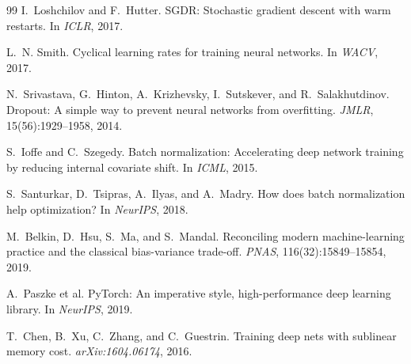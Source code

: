 \documentclass[11pt, a4paper]{article}
\begin{document}
\begin{thebibliography}{99}
I.~Loshchilov and F.~Hutter.
\newblock SGDR: Stochastic gradient descent with warm restarts.
\newblock In \emph{ICLR}, 2017.

L.~N. Smith.
\newblock Cyclical learning rates for training neural networks.
\newblock In \emph{WACV}, 2017.

N.~Srivastava, G.~Hinton, A.~Krizhevsky, I.~Sutskever, and R.~Salakhutdinov.
\newblock Dropout: A simple way to prevent neural networks from overfitting.
\newblock \emph{JMLR}, 15(56):1929--1958, 2014.

S.~Ioffe and C.~Szegedy.
\newblock Batch normalization: Accelerating deep network training by reducing internal covariate shift.
\newblock In \emph{ICML}, 2015.

S.~Santurkar, D.~Tsipras, A.~Ilyas, and A.~Madry.
\newblock How does batch normalization help optimization?
\newblock In \emph{NeurIPS}, 2018.

M.~Belkin, D.~Hsu, S.~Ma, and S.~Mandal.
\newblock Reconciling modern machine-learning practice and the classical bias-variance trade-off.
\newblock \emph{PNAS}, 116(32):15849--15854, 2019.

A.~Paszke et al.
\newblock PyTorch: An imperative style, high-performance deep learning library.
\newblock In \emph{NeurIPS}, 2019.

T.~Chen, B.~Xu, C.~Zhang, and C.~Guestrin.
\newblock Training deep nets with sublinear memory cost.
\newblock \emph{arXiv:1604.06174}, 2016.

\end{thebibliography}
\end{document}

